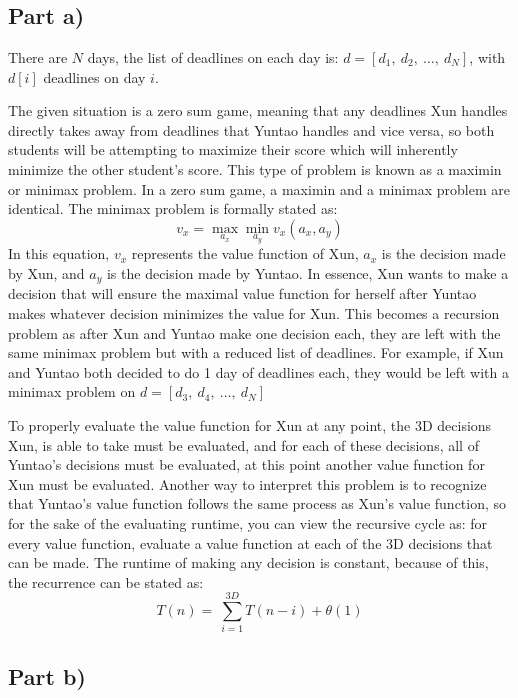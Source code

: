 \section{}

\subsection*{Part a)}

There are $N$ days, the list of deadlines on each day is: $d=[d_1,\ d_2,\ \ldots,\ d_N]$, with $d[i]$ deadlines on day $i$.

The given situation is a zero sum game, meaning that any deadlines Xun handles directly takes away from deadlines that Yuntao handles and vice versa, so both students will be attempting to maximize their score which will inherently minimize the other student's score. This type of problem is known as a maximin or minimax problem. In a zero sum game, a maximin and a minimax problem are identical. The minimax problem is formally stated as:
\[v_x=\max_{a_x}{\min_{a_y}{v_x(a_x,a_y)}}\]
In this equation, $v_x$ represents the value function of Xun, $a_x$ is the decision made by Xun, and $a_y$ is the decision made by Yuntao. In essence, Xun wants to make a decision that will ensure the maximal value function for herself after Yuntao makes whatever decision minimizes the value for Xun. This becomes a recursion problem as after Xun and Yuntao make one decision each, they are left with the same minimax problem but with a reduced list of deadlines. For example, if Xun and Yuntao both decided to do 1 day of deadlines each, they would be left with a minimax problem on $d=[d_3,\ d_4,\ \ldots,\ d_N]$

To properly evaluate the value function for Xun at any point, the 3D decisions Xun, is able to take must be evaluated, and for each of these decisions, all of Yuntao's decisions must be evaluated, at this point another value function for Xun must be evaluated. Another way to interpret this problem is to recognize that Yuntao's value function follows the same process as Xun's value function, so for the sake of the evaluating runtime, you can view the recursive cycle as: for every value function, evaluate a value function at each of the 3D decisions that can be made. The runtime of making any decision is constant, because of this, the recurrence can be stated as:
\[T\left(n\right)=\ \sum_{i=1}^{3D}{T(n-i)}+\theta(1)\]

\subsection*{Part b)}

